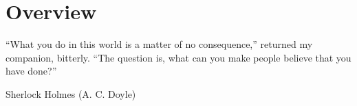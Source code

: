 \documentclass[a4paper,12pt,%
onecolumn,oneside,%
british%
]{memoir}
\providecommand{\href}[2]{#2}
\renewcommand*{\|}[1][]{\nonscript\:#1\vert\nonscript\:\mathopen{}}
\newcommand*{\furl}[2]{\href{#1}{#2}\pagenote{\url{#1}}}
\begin{document}
%
%
%
%
%
%
%


\printpagenotes*
\cleartooddpage
\chapter{Overview}
\label{cha:overview}

\epigraph{\enquote{What you do in this world is a matter of no consequence,} returned my companion, bitterly. \enquote{The question is, what can you make people believe that you have done?\textellipsis}}{Sherlock Holmes (A. C. Doyle) \cites*{doyle1887}}
\end{document}
